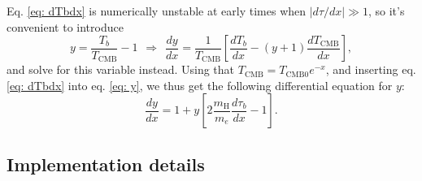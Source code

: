 \documentclass{aa}
\numberwithin{equation}{section}
\numberwithin{table}{section}
\numberwithin{figure}{section}
\begin{document}
Eq. \eqref{eq: dTbdx} is numerically unstable at early times when $|d\tau/dx|\gg 1$, so it's convenient to introduce
\begin{equation}
  y = \frac{T_b}{T_\text{CMB}} - 1 \hspace{5pt}\Rightarrow\hspace{5pt} \frac{dy}{dx} = \frac{1}{T_\text{CMB}}\left[\frac{dT_b}{dx} - (y+1)\frac{dT_\text{CMB}}{dx} \right], \label{eq: y}
\end{equation}
and solve for this variable instead. Using that $T_\text{CMB}=T_\text{CMB0}e^{-x}$, and inserting eq. \eqref{eq: dTbdx} into eq. \eqref{eq: y}, we thus get the following differential equation for $y$:
\begin{equation}
  \frac{dy}{dx} = 1 + y\left[2\frac{m_\text{H}}{m_e}\frac{d\tau_b}{dx} -  1\right].
\end{equation}










\subsection{Implementation details}\label{subsec: II methods}
\end{document}

